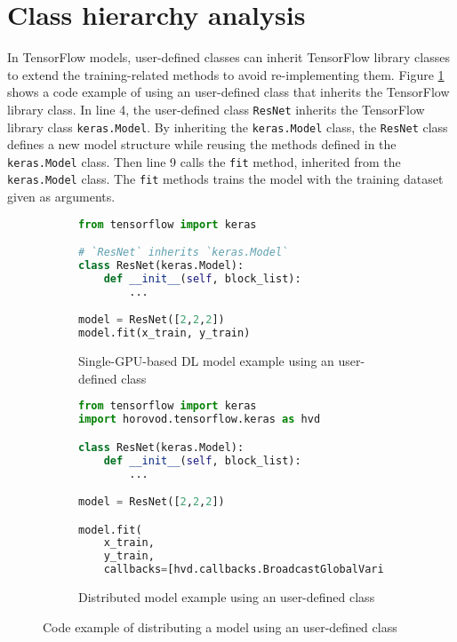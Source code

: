 \section{Class hierarchy analysis}\label{sec:cha}

In TensorFlow models, user-defined classes can inherit 
TensorFlow library classes to extend the training-related methods 
to avoid re-implementing them.
Figure \ref{fig:cha:tfex:a} shows a code example of using an user-defined class
that inherits the TensorFlow library class.
In line 4, the user-defined class {\tt ResNet} inherits the TensorFlow
library class {\tt keras.Model}.
By inheriting the {\tt keras.Model} class, the {\tt ResNet} class
defines a new model structure while reusing the methods 
defined in the {\tt keras.Model} class.
Then line 9 calls the {\tt fit} method, inherited from the {\tt keras.Model} 
class. The {\tt fit} methods trains the model with the training dataset 
given as arguments.

\begin{figure}[!ht]
  \centering
  \begin{subfigure}[t]{0.35\textwidth}
    \begin{lstlisting}[language=Python]
from tensorflow import keras

# `ResNet` inherits `keras.Model`
class ResNet(keras.Model): 
    def __init__(self, block_list):
        ...

model = ResNet([2,2,2])
model.fit(x_train, y_train)\end{lstlisting}
    \caption{Single-GPU-based DL model example using an user-defined class}
    \label{fig:cha:tfex:a}
  \end{subfigure}
  \hspace{3mm}
  \begin{subfigure}[t]{0.6\textwidth}
    \begin{lstlisting}[language=Python]
from tensorflow import keras
import horovod.tensorflow.keras as hvd

class ResNet(keras.Model):
    def __init__(self, block_list):
        ...

model = ResNet([2,2,2])

model.fit(
    x_train, 
    y_train,
    callbacks=[hvd.callbacks.BroadcastGlobalVariablesCallback(0)])\end{lstlisting}
    \caption{Distributed model example using an user-defined class}
    \label{fig:cha:tfex:b}
  \end{subfigure}

  \caption{Code example of distributing a model using an user-defined class}
  \label{fig:cha:tfex}
\end{figure}

